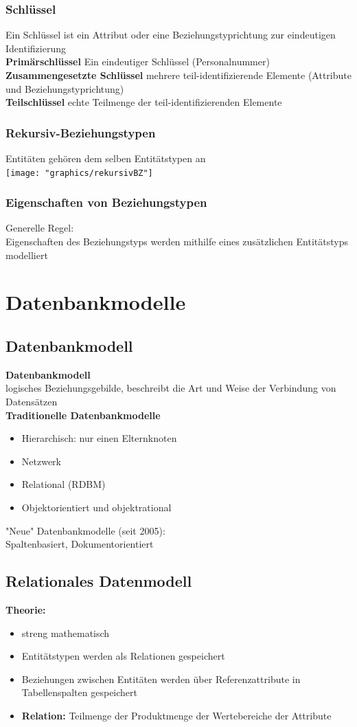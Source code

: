 \documentclass{scrreprt}
\begin{document}
\subsection{Schlüssel}
Ein Schlüssel ist ein Attribut oder eine Beziehungstyprichtung zur eindeutigen Identifizierung
\\\textbf{Primärschlüssel}
Ein eindeutiger Schlüssel (Personalnummer)
\\\textbf{Zusammengesetzte Schlüssel}
mehrere teil-identifizierende Elemente (Attribute und Beziehungstyprichtung)
\\\textbf{Teilschlüssel}
echte Teilmenge der teil-identifizierenden Elemente
\subsection{Rekursiv-Beziehungstypen}
Entitäten gehören dem selben Entitätstypen an
\\\texttt{[image: "graphics/rekursivBZ"]}
\subsection{Eigenschaften von Beziehungstypen}
Generelle Regel:
\\Eigenschaften des Beziehungstyps werden mithilfe eines zusätzlichen Entitätstyps modelliert
\pagebreak
\chapter{Datenbankmodelle}
\section{Datenbankmodell}
\textbf{Datenbankmodell}
\\logisches Beziehungsgebilde, beschreibt die Art und Weise der Verbindung von Datensätzen
\\\textbf{Traditionelle Datenbankmodelle}
\begin{itemize}
  \item Hierarchisch: nur einen Elternknoten
  \item Netzwerk
  \item Relational (RDBM)
  \item Objektorientiert und objektrational
\end{itemize}
"Neue" Datenbankmodelle (seit 2005):
\\Spaltenbasiert, Dokumentorientiert
\section{Relationales Datenmodell}
\textbf{Theorie:}
\begin{itemize}
  \item streng mathematisch
  \item Entitätstypen werden als Relationen gespeichert
  \item Beziehungen zwischen Entitäten werden über Referenzattribute in Tabellenspalten gespeichert
  \item \textbf{Relation:} Teilmenge der Produktmenge der Wertebereiche der Attribute
\end{itemize}
\end{document}

